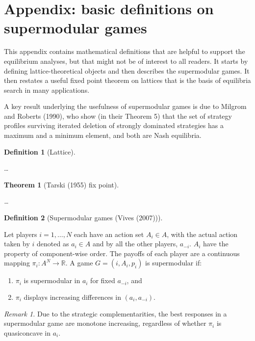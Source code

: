 \documentclass[
]{article}
\theoremstyle{definition}
\newtheorem{definition}{Definition}[section]
\theoremstyle{plain}
\newtheorem{theorem}{Theorem}[section]
\theoremstyle{remark}
\begin{document}
\section*{Appendix: basic definitions on supermodular
games}\label{appendix-basic-definitions-on-supermodular-games}

This appendix contains mathematical definitions that are helpful to
support the equilibrium analyses, but that might not be of interest to
all readers. It starts by defining lattice-theoretical objects and then
describes the supermodular games. It then restates a useful fixed point
theorem on lattices that is the basis of equilibria search in many
applications.

A key result underlying the usefulness of supermodular games is due to
Milgrom and Roberts (1990), who show (in their Theorem 5) that the set
of strategy profiles surviving iterated deletion of strongly dominated
strategies has a maximum and a minimum element, and both are Nash
equilibria.

\begin{definition}[Lattice]\protect\hypertarget{def-lattice}{}\label{def-lattice}

\ldots{}

\end{definition}

\begin{theorem}[Tarski (1955) fix
point]\protect\hypertarget{thm-fixedpoint}{}\label{thm-fixedpoint}

\ldots{}

\end{theorem}

\begin{definition}[Supermodular games (Vives
(2007))]\protect\hypertarget{def-supermodular}{}\label{def-supermodular}

Let players \(i= 1, \dots, N\) each have an action set \(A_i \in A\),
with the actual action taken by \(i\) denoted as \(a_i \in A\) and by
all the other players, \(a_{-i}\). \(A_i\) have the property of
component-wise order. The payoffs of each player are a continuous
mapping \(\pi_i : A^N \to \mathbb{R}\). A game \(G = (i, A_i, p_i)\) is
supermodular if:

\begin{enumerate}
\def\labelenumi{\arabic{enumi}.}
\item
  \(\pi_i\) is supermodular in \(a_i\) for fixed \(a_{-i}\), and
\item
  \(\pi_i\) displays increasing differences in \((a_i, a_{-i})\).
\end{enumerate}

\emph{Remark 1.} Due to the strategic complementarities, the best
responses in a supermodular game are monotone increasing, regardless of
whether \(\pi_i\) is quasiconcave in \(a_i\).

\end{definition}
\end{document}
